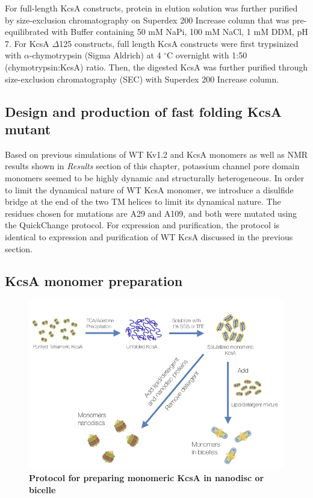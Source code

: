 For full-length KcsA constructs, protein in elution solution was further purified by size-exclusion chromatography on Superdex 200 Increase column that was pre-equilibrated with Buffer containing 50 mM NaPi, 100 mM NaCl, 1 mM DDM, pH 7. For KcsA $\Delta$125 constructs, full length KcsA constructs were first trypsinized with $\alpha$-chymotrypsin (Sigma Aldrich) at 4 $^{\circ}$C overnight with 1:50 (chymotrypsin:KcsA) ratio. Then, the digested KcsA was further purified through size-exclusion chromatography (SEC) with Superdex 200 Increase column. 

\subsection{Design and production of fast folding KcsA mutant}
Based on previous simulations of WT Kv1.2 and KcsA monomers as well as NMR results shown in \textit{Results} section of this chapter, potassium channel pore domain monomers seemed to be highly dynamic and structurally heterogeneous. In order to limit the dynamical nature of WT KcsA monomer, we introduce a disulfide bridge at the end of the two TM helices to limit its dynamical nature. The residues chosen for mutations are A29 and A109, and both were mutated using the QuickChange protocol. For expression and purification, the protocol is identical to expression and purification of WT KcsA discussed in the previous section.

\subsection{KcsA monomer preparation}
\begin{figure}[!ht]
\begin{center}
	\includegraphics[width=\textwidth]{figures/chapter3/monomer_prep.png}
\end{center}
	\caption{\textbf{Protocol for preparing monomeric KcsA in nanodisc or bicelle}}
	\label{fig:ch3_f1}
\end{figure}

